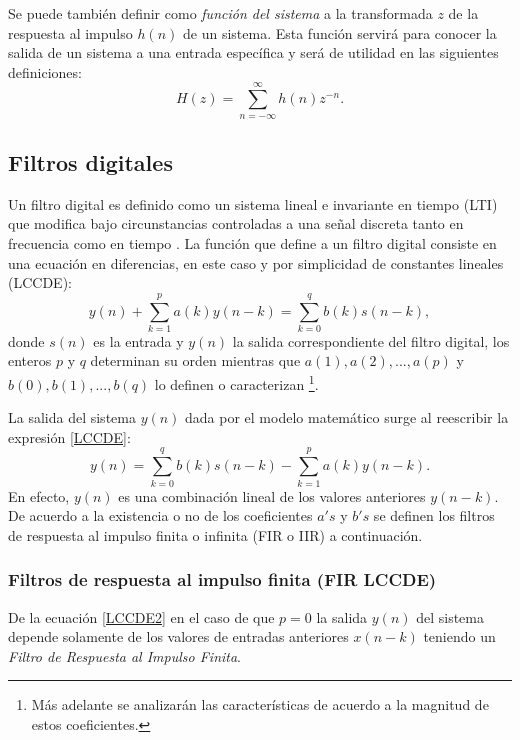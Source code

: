 Se puede también definir como \emph{función del sistema} a la transformada $z$ de la respuesta al impulso $h(n)$ de un sistema. Esta función servirá para conocer la salida de un sistema a una entrada específica y será de utilidad en las siguientes definiciones:  
\begin{equation}\label{H}
H(z) = \sum_{n=-\infty}^{\infty} h(n)z^{-n}.
\end{equation}
\subsection{Filtros digitales}
Un filtro digital es definido como un sistema lineal e invariante en tiempo (LTI) que modifica bajo circunstancias controladas a una señal discreta tanto en frecuencia como en tiempo \cite[]{Hayes96}. La función  que define a un filtro digital consiste en una ecuación en diferencias, en este caso y por simplicidad de constantes lineales (LCCDE):
\begin{equation}\label{LCCDE}
y(n) +\sum_{k=1}^p a(k)y(n-k)=\sum_{k=0}^q b(k)s(n-k),
\end{equation}
donde $s(n)$ es la entrada y $y(n)$ la salida correspondiente del filtro digital, los enteros $p$ y $q$ determinan su orden mientras que $a(1), a(2) ,..., a(p)$ y $b(0), b(1), ..., b(q)$ lo definen o caracterizan \footnote{Más adelante se analizarán las características de acuerdo a la  magnitud de  estos coeficientes.}.

La salida del sistema $y(n)$ dada por el modelo matemático surge al reescribir la expresión \eqref{LCCDE}:
\begin{equation}\label{LCCDE2}
y(n) =\sum_{k=0}^q b(k)s(n-k) -\sum_{k=1}^p a(k)y(n-k).
\end{equation}
 En efecto, $y(n)$ es una combinación lineal de los valores anteriores $y(n-k)$. De acuerdo a la existencia o no de los coeficientes $a's$ y $b's$ se definen los filtros de respuesta al impulso finita o infinita (FIR o IIR) a continuación.

\subsubsection{Filtros de respuesta al impulso finita (FIR LCCDE)}
De la ecuación \eqref{LCCDE2} en el caso de que $p=0$ la salida $y(n)$ del sistema depende solamente de los valores de entradas anteriores $x(n-k)$ teniendo un \emph{Filtro de Respuesta al Impulso Finita}. 


